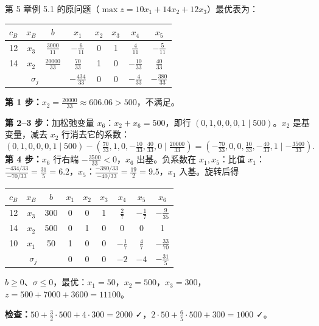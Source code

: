 \begin{examplebox}
第 5 章例 5.1 的原问题（$\max z=10x_1+14x_2+12x_3$）最优表为：
\begin{center}\small
\begin{tabular}{@{}ccc|ccccc@{}}\toprule
$c_B$ & $x_B$ & $b$ & $x_1$ & $x_2$ & $x_3$ & $x_4$ & $x_5$\\\midrule
12 & $x_3$ & $\frac{3000}{11}$ & $-\frac{6}{11}$ & 0 & 1 & $\frac{4}{11}$ & $-\frac{5}{11}$\\
14 & $x_2$ & $\frac{20000}{33}$ & $\frac{70}{33}$ & 1 & 0 & $-\frac{10}{33}$ & $\frac{40}{33}$\\\midrule
\multicolumn{3}{c|}{$\sigma_j$} & $-\frac{434}{33}$ & 0 & 0 & $-\frac{4}{33}$ & $-\frac{380}{33}$\\\bottomrule
\end{tabular}
\end{center}
\textbf{第 1 步：}$x_2=\frac{20000}{33}\approx606.06>500$，不满足。\par
\textbf{第 2--3 步：}加松弛变量 $x_6$：$x_2+x_6=500$，即行 $(0,1,0,0,0,1\mid500)$。$x_2$ 是基变量，减去 $x_2$ 行消去它的系数：
\[
(0,1,0,0,0,1\mid500)-(\tfrac{70}{33},1,0,-\tfrac{10}{33},\tfrac{40}{33},0\mid\tfrac{20000}{33})
=(-\tfrac{70}{33},0,0,\tfrac{10}{33},-\tfrac{40}{33},1\mid-\tfrac{3500}{33}).
\]
\textbf{第 4 步：}$x_6$ 行右端 $-\frac{3500}{33}<0$，$x_6$ 出基。负系数在 $x_1,x_5$：比值 $x_1$：$\frac{-434/33}{-70/33}=\frac{31}{5}=6.2$，$x_5$：$\frac{-380/33}{-40/33}=\frac{19}{2}=9.5$，$x_1$ 入基。旋转后得
\begin{center}\small
\begin{tabular}{@{}ccc|cccccc@{}}\toprule
$c_B$ & $x_B$ & $b$ & $x_1$ & $x_2$ & $x_3$ & $x_4$ & $x_5$ & $x_6$\\\midrule
12 & $x_3$ & 300 & 0 & 0 & 1 & $\frac27$ & $-\frac17$ & $-\frac{9}{35}$\\
14 & $x_2$ & 500 & 0 & 1 & 0 & 0 & 0 & 1\\
10 & $x_1$ & 50 & 1 & 0 & 0 & $-\frac17$ & $\frac47$ & $-\frac{33}{70}$\\\midrule
\multicolumn{3}{c|}{$\sigma_j$} & 0 & 0 & 0 & $-2$ & $-4$ & $-\frac{31}{5}$\\\bottomrule
\end{tabular}
\end{center}
$b\ge0$、$\sigma\le0$，最优：$x_1=50$，$x_2=500$，$x_3=300$，$z=500+7000+3600=11100$。\par
\textbf{检查：}$50+\frac32\cdot500+4\cdot300=2000$ ✓，$2\cdot50+\frac65\cdot500+300=1000$ ✓。
\end{examplebox}

